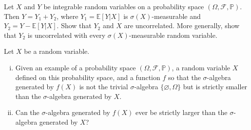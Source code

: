\documentclass[11pt]{article}
\newcommand\E{\mathbb{E}}
\renewcommand\P{\mathbb{P}} %
\newcommand\cF{\mathcal{F}}
\newcounter{question}[section]
\begin{document}
    \begin{hwquestion}
        Let $X$ and $Y$ be integrable random variables on a probability space $(\Omega,
        \cF, \P)$. Then $Y = Y_1 + Y_2$, where $Y_1 = \E[Y | X]$ is $\sigma(X)$-measurable
        and $Y_2 = Y - \E[Y | X]$. Show that $Y_2$ and $X$ are uncorrelated. More generally,
        show that $Y_2$ is uncorrelated with every $\sigma(X)$-measurable random variable.
    \end{hwquestion}





    \begin{hwquestion}
        Let $X$ be a random variable.

        \vspace{2mm}

        \begin{enumerate}[(i), nolistsep]
            \item Given an example of a probability space $(\Omega, \cF, \P)$, a random
            variable $X$ defined on this probability space, and a function $f$ so that the
            $\sigma$-algebra generated by $f(X)$ is not the trivial $\sigma$-algebra $\{
            \varnothing, \Omega \}$ but is strictly smaller than the $\sigma$-algebra
            generated by $X$.

            \item Can the $\sigma$-algebra generated by $f(X)$ ever be strictly larger than
            the $\sigma$-algebra generated by $X$?
        \end{enumerate}
    \end{hwquestion}
\end{document}
